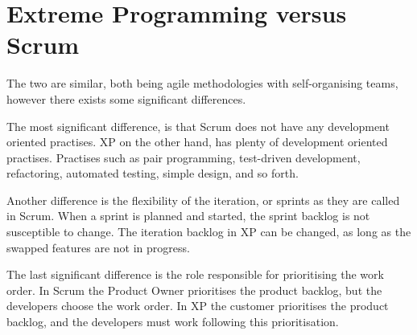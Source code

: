 \section{Extreme Programming versus Scrum}
The two are similar, both being agile methodologies with self-organising teams, however there exists some significant differences.

The most significant difference, is that Scrum does not have any development oriented practises.
XP on the other hand, has plenty of development oriented practises. Practises such as pair programming, test-driven development, refactoring, automated testing, simple design, and so forth.

Another difference is the flexibility of the iteration, or sprints as they are called in Scrum.
When a sprint is planned and started, the sprint backlog is not susceptible to change.
The iteration backlog in XP can be changed, as long as the swapped features are not in progress.

The last significant difference is the role responsible for prioritising the work order.
In Scrum the Product Owner prioritises the product backlog, but the developers choose the work order.
In XP the customer prioritises the product backlog, and the developers must work following this prioritisation. 